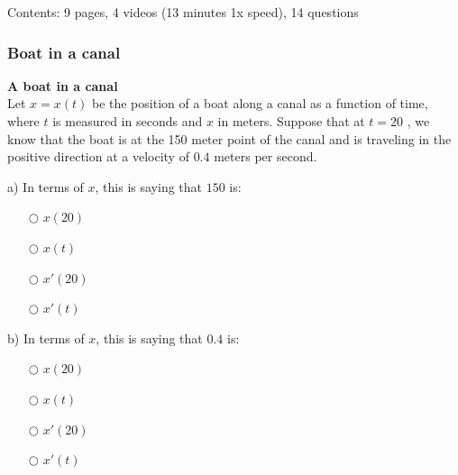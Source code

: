 \documentclass[pdftex, brazil, 12pt, twoside]{article}
\begin{document}
Contents: 9 pages, 4 videos (13 minutes 1x speed), 14 questions

\subsubsection{Boat in a canal}
\label{u2-linear-approx-boat}

\begin{exercise}
  \textbf{A boat in a canal}\\%
  Let $x=x(t)$ be the position of a boat along a canal as a function of time, where
  $t$ is measured in seconds and $x$ in meters. Suppose that at $t=20$ , we know that
  the boat is at the 150 meter point of the canal and is traveling in the positive
  direction at a velocity of $0.4$ meters per second.
  \begin{figure}[H]
    \begin{center}
    \end{center}
  \end{figure}
  a) In terms of $x$, this is saying that $150$ is:
  \begin{itemize}[noitemsep]
  \item[$\bigcirc$] $x(20)$
  \item[$\bigcirc$] $x(t)$
  \item[$\bigcirc$] $x'(20)$
  \item[$\bigcirc$] $x'(t)$
  \end{itemize}

  b) In terms of $x$, this is saying that $0.4$ is:
  \begin{itemize}[noitemsep]
  \item[$\bigcirc$] $x(20)$
  \item[$\bigcirc$] $x(t)$
  \item[$\bigcirc$] $x'(20)$
  \item[$\bigcirc$] $x'(t)$
  \end{itemize}
\end{exercise}
\end{document}
